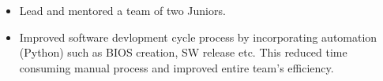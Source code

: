\documentclass[11pt,a4paper,sans]{moderncv} %
\begin{document}
{\begin{itemize}
\begin{itemize}
\item Presented a poster at at AMD's Internal AATC 2023 Conference.
\item Submitted 3 innovation reports which are under scrutiny of AMD's patent team.
\item Submitted papers and research work at AMD's iExpo, AATC 2023, 2024 platforms.
\end{itemize}
\item Lead and mentored a team of two Juniors.
\item Improved software devlopment cycle process by incorporating automation (Python) such as BIOS creation, SW release etc. This reduced time consuming manual process and improved entire team's efficiency.
\end{itemize}}

\vspace{0.5cm}

\end{document}
